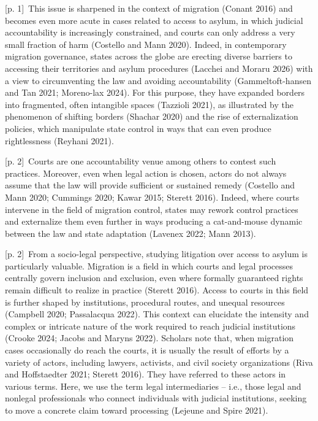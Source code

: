 \documentclass[10pt,a4paper]{article}
\begin{document}
{\scriptsize\color{gray} [p. 1]}\ This issue is sharpened in the context of migration (Conant 2016) and becomes even more acute in cases related to access to asylum, in which judicial accountability is increasingly constrained, and courts can only address a very small fraction of harm (Costello and Mann 2020). Indeed, in contemporary migration governance, states across the globe are erecting diverse barriers to accessing their territories and asylum procedures (Lacchei and Moraru 2026) with a view to circumventing the law and avoiding accountability (Gammeltoft-hansen and Tan 2021; Moreno-lax 2024). For this purpose, they have expanded borders into fragmented, often intangible spaces (Tazzioli 2021), as illustrated by the phenomenon of shifting borders (Shachar 2020) and the rise of externalization policies, which manipulate state control in ways that can even produce rightlessness (Reyhani 2021).\par
{\scriptsize\color{gray} [p. 2]}\ Courts are one accountability venue among others to contest such practices. Moreover, even when legal action is chosen, actors do not always assume that the law will provide sufficient or sustained remedy (Costello and Mann 2020; Cummings 2020; Kawar 2015; Sterett 2016). Indeed, where courts intervene in the field of migration control, states may rework control practices and externalize them even further in ways producing a cat-and-mouse dynamic between the law and state adaptation (Lavenex 2022; Mann 2013).\par
{\scriptsize\color{gray} [p. 2]}\ From a socio-legal perspective, studying litigation over access to asylum is particularly valuable. Migration is a field in which courts and legal processes centrally govern inclusion and exclusion, even where formally guaranteed rights remain difficult to realize in practice (Sterett 2016). Access to courts in this field is further shaped by institutions, procedural routes, and unequal resources (Campbell 2020; Passalacqua 2022). This context can elucidate the intensity and complex or intricate nature of the work required to reach judicial institutions (Crooke 2024; Jacobs and Maryns 2022). Scholars note that, when migration cases occasionally do reach the courts, it is usually the result of efforts by a variety of actors, including lawyers, activists, and civil society organizations (Riva and Hoffstaedter 2021; Sterett 2016). They have referred to these actors in various terms. Here, we use the term legal intermediaries – i.e., those legal and nonlegal professionals who connect individuals with judicial institutions, seeking to move a concrete claim toward processing (Lejeune and Spire 2021).\par
\end{document}
